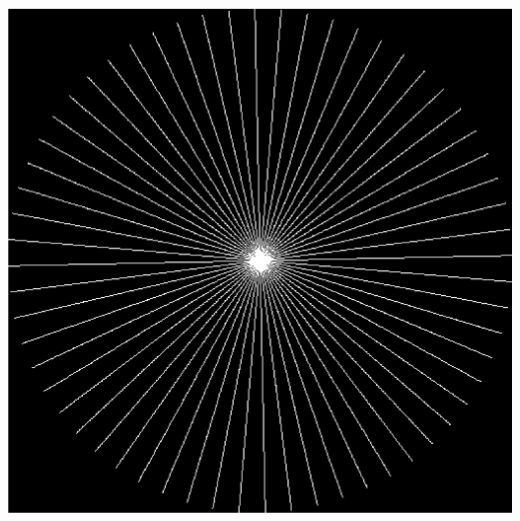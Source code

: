 \documentclass{beamer}
\begin{document}
\begin{frame}
{\begin{minipage}{0.2\linewidth}
	\includegraphics[width=\textwidth]{../img/intro/pradial.eps}
\end{minipage}}
\end{frame}
\end{document}
